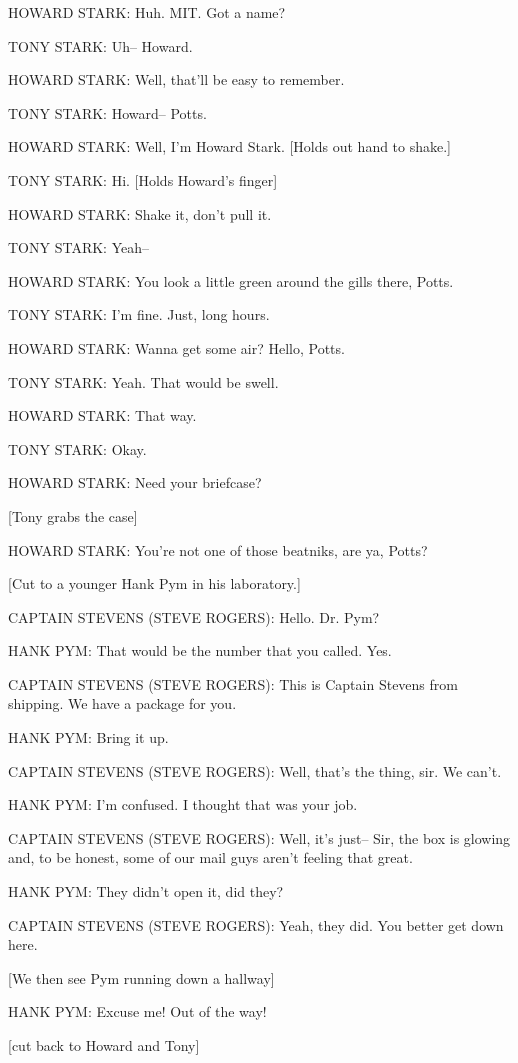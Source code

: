 HOWARD STARK: Huh. MIT. Got a name?

TONY STARK: Uh– Howard.

HOWARD STARK: Well, that'll be easy to remember.

TONY STARK: Howard– Potts.

HOWARD STARK: Well, I'm Howard Stark. [Holds out hand to shake.]

TONY STARK: Hi. [Holds Howard's finger]

HOWARD STARK: Shake it, don't pull it.

TONY STARK: Yeah–

HOWARD STARK: You look a little green around the gills there, Potts.

TONY STARK: I'm fine. Just, long hours.

HOWARD STARK: Wanna get some air? Hello, Potts.

TONY STARK: Yeah. That would be swell.

HOWARD STARK: That way.

TONY STARK: Okay.

HOWARD STARK: Need your briefcase?

[Tony grabs the case]

HOWARD STARK: You're not one of those beatniks, are ya, Potts?

[Cut to a younger Hank Pym in his laboratory.]

CAPTAIN STEVENS (STEVE ROGERS): Hello. Dr. Pym?

HANK PYM: That would be the number that you called. Yes.

CAPTAIN STEVENS (STEVE ROGERS): This is Captain Stevens from shipping. We have a package for you.

HANK PYM: Bring it up.

CAPTAIN STEVENS (STEVE ROGERS): Well, that's the thing, sir. We can't.

HANK PYM: I'm confused. I thought that was your job.

CAPTAIN STEVENS (STEVE ROGERS): Well, it's just– Sir, the box is glowing and, to be honest, some of our mail guys aren't feeling that great.

HANK PYM: They didn't open it, did they?

CAPTAIN STEVENS (STEVE ROGERS): Yeah, they did. You better get down here.

[We then see Pym running down a hallway]

HANK PYM: Excuse me! Out of the way!

[cut back to Howard and Tony]

